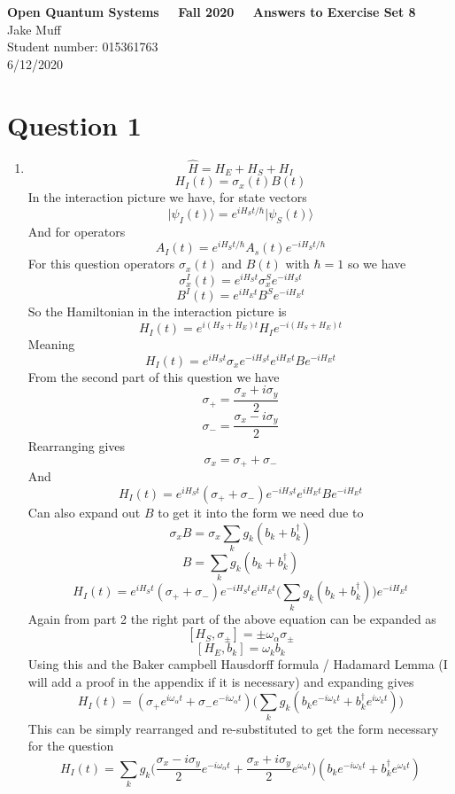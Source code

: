 \documentclass[12pt]{article}
\newcommand{\ket}[1]{\vert{#1}\rangle}
\begin{document}
\normalsize

\baselineskip 14pt

\begin{center}
{\Large {\bf Open Quantum Systems \ \ Fall 2020 \ \  Answers to Exercise Set 8}}\\
{\large { Jake Muff}}\\
{Student number: 015361763}\\
{6/12/2020}
\end{center}



\section{Question 1}
\begin{enumerate}
    \item $$ \hat{H} = H_E + H_S + H_I $$
    $$ H_I (t) = \sigma_x (t) B(t) $$
    In the interaction picture we have, for state vectors 
    $$ \ket{\psi_I (t)} = e^{i H_S t/ \hbar} \ket{\psi_S (t) } $$
    And for operators 
    $$ A_I (t) = e^{i H_S t / \hbar} A_s (t) e^{-i H_S t / \hbar}$$ 
    For this question operators $\sigma_x (t)$ and $B(t)$ with $\hbar = 1$ so we have 
    $$ \sigma^I_x (t) = e^{i H_S t} \sigma^S_x e^{-i H_S t} $$
    $$ B^I (t) = e^{iH_E t} B^S e^{-i H_E t} $$
    So the Hamiltonian in the interaction picture is 
    $$ H_I (t) = e^{i (H_S + H_E) t} H_I e^{-i (H_S + H_E) t} $$
    Meaning 
    $$ H_I (t) = e^{i H_S t} \sigma_x e^{-i H_S t} e^{i H_E t} B e^{-i H_E t} $$
    From the second part of this question we have 
    $$ \sigma_+ = \frac{\sigma_x + i \sigma_y}{2} $$
    $$ \sigma_- = \frac{\sigma_x - i \sigma_y}{2} $$
    Rearranging gives 
    $$ \sigma_x = \sigma_+ + \sigma_- $$
    And 
    $$ H_I (t) = e^{i H_S t} (\sigma_+ + \sigma_-)e^{-i H_S t} e^{i H_E t} B e^{-i H_E t} $$
    Can also expand out $B$ to get it into the form we need due to
    $$ \sigma_x B = \sigma_x \sum_k g_k (b_k + b_k^{\dagger} ) $$
    $$ B = \sum_k g_k (b_k + b_k^{\dagger}) $$
    $$ H_I (t) = e^{i H_S t} (\sigma_+ + \sigma_-)e^{-i H_S t} e^{i H_E t} \Big( \sum_k g_k (b_k + b_k^{\dagger} ) \Big) e^{-i H_E t} $$
    Again from part 2 the right part of the above equation can be expanded as 
    $$ [H_S, \sigma_{\pm} ] = \pm \omega_{\alpha} \sigma_{\pm} $$
    $$ [H_E, b_k] = \omega_k b_k $$
    Using this and the Baker campbell Hausdorff formula / Hadamard Lemma (I will add a proof in the appendix if it is necessary) and expanding gives 
    $$ H_I (t) = (\sigma_+ e^{i \omega_{\alpha} t} + \sigma_- e^{-i \omega_{\alpha} t} )\Big(\sum_k g_k ( b_k e^{-i \omega_{k} t} + b_k^{\dagger} e^{i \omega_k t} ) \Big)$$
    This can be simply rearranged and re-substituted to get the form necessary for the question 
    $$ H_I (t) = \sum_k g_k \Big( \frac{\sigma_x - i \sigma_y}{2} e^{-i \omega_{\alpha} t} + \frac{\sigma_x + i \sigma_y}{2} e^{\omega_{\alpha} t}\Big) (b_k e^{-i \omega_{k} t} + b_k^{\dagger} e^{\omega_k t} ) $$


\end{enumerate}
\end{document}
